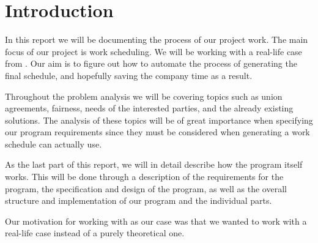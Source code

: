 \chapter*{Introduction}
In this report we will be documenting the process of our project work. The main focus of our project is work scheduling. We will be working with a real-life case from \siemens. Our aim is to figure out how to automate the process of generating the final schedule, and hopefully saving the company time as a result.

Throughout the problem analysis we will be covering topics such as union agreements, fairness, needs of the interested parties, and the already existing solutions. The analysis of these topics will be of great importance when specifying our program requirements since they must be considered when generating a work schedule \siemens can actually use.

As the last part of this report, we will in detail describe how the program itself works. This will be done through a description of the requirements for the program, the specification and design of the program, as well as the overall structure and implementation of our program and the individual parts.

Our motivation for working with \siemens as our case was that we wanted to work with a real-life case instead of a purely theoretical one.